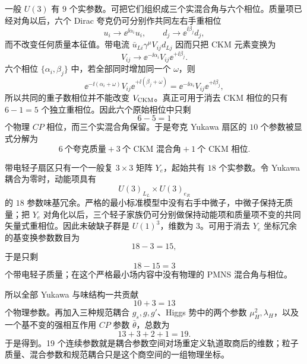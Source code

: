 \begin{derivation}[场重定义后的独立物理参数]
一般 $U(3)$ 有 $9$ 个实参数。可把它们组织成三个实混合角与六个相位。质量项已经对角以后，六个 Dirac 夸克仍可分别作共同左右手重相位
\begin{equation*}
 u_i\to \ee^{\ii\alpha_i}u_i,
 \qquad
 d_j\to \ee^{\ii\beta_j}d_j,
\end{equation*}
而不改变任何质量本征值。带电流
$\bar u_{Li}\gamma^\mu V_{ij}d_{Lj}$ 因而只把 CKM 元素变换为
\begin{equation*}
 V_{ij}\longrightarrow
 \ee^{-\ii\alpha_i}V_{ij}\ee^{+\ii\beta_j}.
\end{equation*}
六个相位 $\{\alpha_i,\beta_j\}$ 中，若全部同时增加同一个 $\omega$，则
\begin{equation*}
 \ee^{-\ii(\alpha_i+\omega)}V_{ij}
 \ee^{+\ii(\beta_j+\omega)}
 =\ee^{-\ii\alpha_i}V_{ij}\ee^{+\ii\beta_j},
\end{equation*}
所以共同的重子数相位并不能改变 $V_{\rm CKM}$。真正可用于消去 CKM 相位的只有 $6-1=5$ 个独立重相位。因此六个原始相位中只剩
\begin{equation*}
 6-5=1
\end{equation*}
个物理 $CP$ 相位，而三个实混合角保留。于是夸克 Yukawa 扇区的 $10$ 个参数被显式分解为
\begin{equation*}
 \boxed{6\ \text{个夸克质量}
 +3\ \text{个 CKM 混合角}
 +1\ \text{个 CKM 相位}.}
\end{equation*}

带电轻子扇区只有一个一般复 $3\times3$ 矩阵 $Y_e$，起始共有 $18$ 个实参数。令 Yukawa 耦合为零时，动能项具有
\begin{equation*}
 U(3)_{L_L}\times U(3)_{e_R}
\end{equation*}
的 $18$ 参数味基冗余。严格的最小标准模型中没有右手中微子，中微子保持无质量；把 $Y_e$ 对角化以后，三个轻子家族仍可分别做保持动能项和质量项不变的共同矢量式重相位。因此未破缺子群是 $U(1)^3$，维数为 $3$。可用于消去 $Y_e$ 坐标冗余的基变换参数数目为
\begin{equation*}
 18-3=15,
\end{equation*}
于是只剩
\begin{equation*}
 18-15=3
\end{equation*}
个带电轻子质量；在这个严格最小场内容中没有物理的 PMNS 混合角与相位。

所以全部 Yukawa 与味结构一共贡献
\begin{equation*}
 10+3=13
\end{equation*}
个物理参数。再加入三种规范耦合 $g_s,g,g'$、Higgs 势中的两个参数 $\mu_H^2,\lambda_H$，以及一个基不变的强相互作用 $CP$ 参数 $\bar\theta$，总数为
\begin{equation*}
 13+3+2+1=19.
\end{equation*}
于是得到。19 个连续参数就是耦合参数空间对场重定义轨道取商后的维数；粒子质量、混合参数和规范耦合只是这个商空间的一组物理坐标。
\end{derivation}


